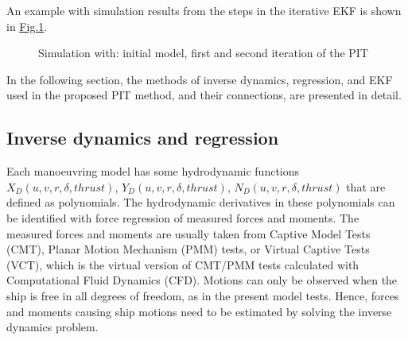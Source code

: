 \documentclass[review]{elsarticle}
\begin{document}
  
An example with simulation results from the steps in the iterative EKF is shown in \hyperref[\detokenize{01.01_method:iterations}]{Fig.\@ \ref{\detokenize{01.01_method:iterations}}}.

\begin{figure}[H]
\centering
\capstart

\noindent{}
\caption{Simulation with: initial model, first and second iteration of the PIT}\label{\detokenize{01.01_method:iterations}}\end{figure}

  
In the following section, the methods of inverse dynamics, regression, and EKF used in the proposed PIT method, and their connections, are presented in detail.


\subsection{Inverse dynamics and regression}
\label{\detokenize{03.01_inverse_dynamics:inverse-dynamics-and-regression}}\label{\detokenize{03.01_inverse_dynamics::doc}}
  
Each manoeuvring model has some hydrodynamic functions \(X_D(u,v,r,\delta,thrust)\), \(Y_D(u,v,r,\delta,thrust)\), \(N_D(u,v,r,\delta,thrust)\) that are defined as polynomials. The hydrodynamic derivatives in these polynomials can be identified with force regression of measured forces and moments. The measured forces and moments are usually taken from Captive Model Tests (CMT), Planar Motion Mechanism (PMM) tests, or Virtual Captive Tests (VCT), which is the virtual version of CMT/PMM tests calculated with Computational Fluid Dynamics (CFD). Motions can only be observed when the ship is free in all degrees of freedom, as in the present model tests. Hence, forces and moments causing ship motions need to be estimated by solving the inverse dynamics problem.
\end{document}
